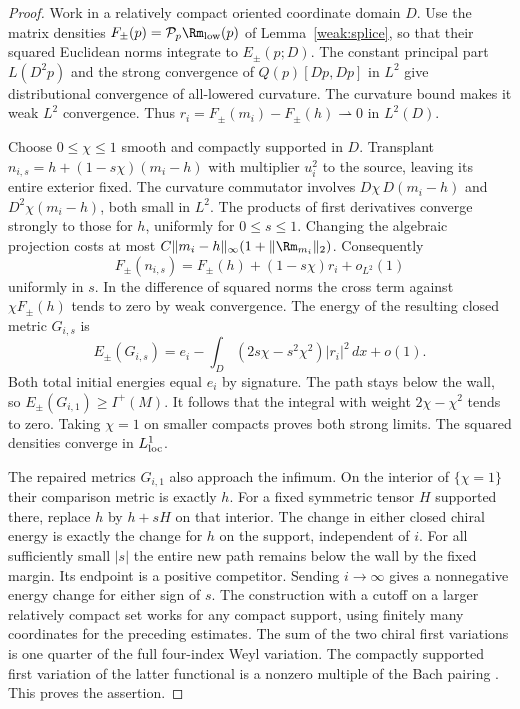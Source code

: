 \begin{proof}
Work in a relatively compact oriented coordinate domain \(D\).
Use the matrix densities \(F_\pm(p)=\mathcal P_p\Rm_{\rm low}(p)\)
of Lemma~\ref{weak:splice}, so that their squared Euclidean norms
integrate to \(E_\pm(p;D)\). The constant principal part
\(L(D^2p)\) and the strong convergence of \(Q(p)[Dp,Dp]\) in
\(L^2\) give distributional convergence of all-lowered curvature.
The curvature bound makes it weak \(L^2\) convergence. Thus
\(r_i=F_\pm(m_i)-F_\pm(h)\rightharpoonup0\) in \(L^2(D)\).

Choose \(0\le\chi\le1\) smooth and compactly supported in \(D\).
Transplant \(n_{i,s}=h+(1-s\chi)(m_i-h)\) with multiplier \(u_i^2\)
to the source, leaving its entire exterior fixed. The curvature
commutator involves \(D\chi\,D(m_i-h)\) and \(D^2\chi(m_i-h)\),
both small in \(L^2\). The products of first derivatives converge
strongly to those for \(h\), uniformly for \(0\le s\le1\).
Changing the algebraic projection costs at most
\(C\|m_i-h\|_\infty(1+\|\Rm_{m_i}\|_2)\). Consequently
\[
 F_\pm(n_{i,s})=F_\pm(h)+(1-s\chi)r_i+o_{L^2}(1)
\]
uniformly in \(s\). In the difference of squared norms the cross
term against \(\chi F_\pm(h)\) tends to zero by weak convergence.
The energy of the resulting closed metric \(G_{i,s}\) is
\[
 E_\pm(G_{i,s})=e_i-
 \int_D (2s\chi-s^2\chi^2)|r_i|^2\,dx+o(1).
\]
Both total initial energies equal \(e_i\) by signature. The path
stays below the wall, so \(E_\pm(G_{i,1})\ge I^+(M)\). It follows
that the integral with weight \(2\chi-\chi^2\) tends to zero.
Taking \(\chi=1\) on smaller compacts proves both strong limits.
The squared densities converge in \(L^1_{\rm loc}\).

The repaired metrics \(G_{i,1}\) also approach the infimum. On the
interior of \(\{\chi=1\}\) their comparison metric is exactly \(h\).
For a fixed symmetric tensor \(H\) supported there, replace \(h\)
by \(h+sH\) on that interior. The change in either closed chiral
energy is exactly the change for \(h\) on the support, independent
of \(i\). For all sufficiently small \(|s|\) the entire new path
remains below the wall by the fixed margin. Its endpoint is a
positive competitor. Sending \(i\to\infty\) gives a nonnegative
energy change for either sign of \(s\). The construction with a
cutoff on a larger relatively compact set works for any compact
support, using finitely many coordinates for the preceding estimates.
The sum of the two chiral first variations is one quarter of the full four-index Weyl variation. The compactly supported first variation of the latter functional is
a nonzero multiple of the Bach pairing
\cite[\S2.1]{TianViaclovsky2004Moduli}. This proves the assertion.
\end{proof}

